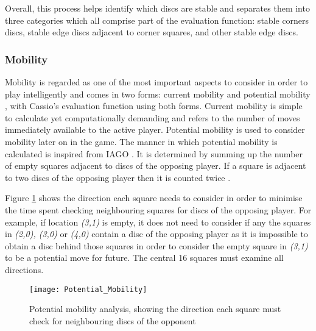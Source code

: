 \documentclass[12pt,a4paper]{article}
\begin{document}
Overall, this process helps identify which discs are stable and separates them into three categories which all comprise part of the evaluation function: stable corners discs, stable edge discs adjacent to corner squares, and other stable edge discs.


\subsubsection*{Mobility}
Mobility is regarded as one of the most important aspects to consider in order to play intelligently and comes in two forms: current mobility and potential mobility \cite{sannidhanam2015analysis}, with Cassio's evaluation function using both forms. Current mobility is simple to calculate yet computationally demanding and refers to the number of moves immediately available to the active player. Potential mobility is used to consider mobility later on in the game. The manner in which potential mobility is calculated is inspired from IAGO \cite{rosenbloom1982world}. It is determined by summing up the number of empty squares adjacent to discs of the opposing player. If a square is adjacent to two discs of the opposing player then it is counted twice \cite{rosenbloom1982world}. 

Figure \ref{fig:potential_mobility} shows the direction each square needs to consider in order to minimise the time spent checking neighbouring squares for discs of the opposing player. For example, if location \textit{(3,1)} is empty, it does not need to consider if any the squares in \textit{(2,0), (3,0)} or \textit{(4,0)} contain a disc of the opposing player as it is impossible to obtain a disc behind those squares in order to consider the empty square in \textit{(3,1)} to be a potential move for future. The central 16 squares must examine all directions.

\begin{figure}[H]
\captionsetup{justification=centering}
\centering
\texttt{[image: Potential\_Mobility]}
\caption{Potential mobility analysis, showing the direction each square must  check for neighbouring discs of the opponent}
\label{fig:potential_mobility}
\end{figure}
\end{document}
